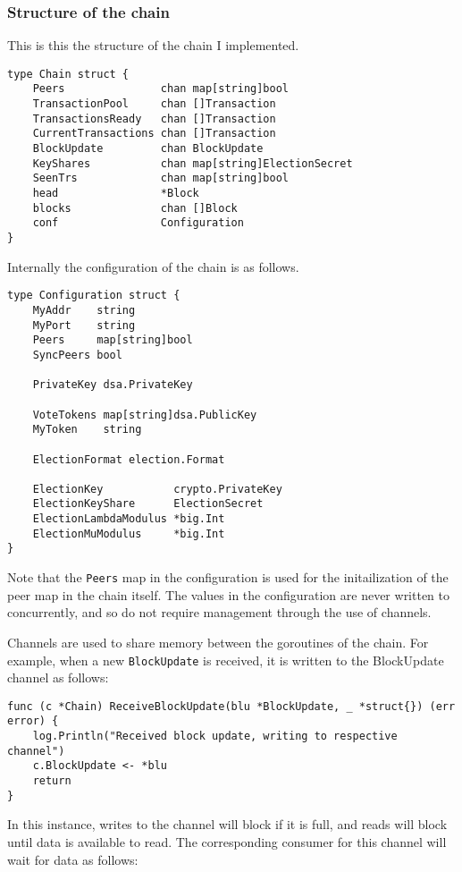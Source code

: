 \documentclass[a4paper,12pt]{article}
\begin{document}
\subsubsection{Structure of the chain}
This is this the structure of the chain I implemented.
\begin{Verbatim}[obeytabs,tabsize=4]
type Chain struct {
	Peers               chan map[string]bool
	TransactionPool     chan []Transaction
	TransactionsReady   chan []Transaction
	CurrentTransactions chan []Transaction
	BlockUpdate         chan BlockUpdate
	KeyShares           chan map[string]ElectionSecret
	SeenTrs             chan map[string]bool
	head                *Block
	blocks              chan []Block
	conf                Configuration
}
\end{Verbatim}

Internally the configuration of the chain is as follows.
\begin{Verbatim}[obeytabs,tabsize=4]
type Configuration struct {
	MyAddr    string
	MyPort    string
	Peers     map[string]bool
	SyncPeers bool

	PrivateKey dsa.PrivateKey

	VoteTokens map[string]dsa.PublicKey
	MyToken    string

	ElectionFormat election.Format

	ElectionKey           crypto.PrivateKey
	ElectionKeyShare      ElectionSecret
	ElectionLambdaModulus *big.Int
	ElectionMuModulus     *big.Int
}
\end{Verbatim}

Note that the \verb|Peers| map in the configuration is used for the initailization of the peer map in the chain itself. The values in the configuration are never written to concurrently, and so do not require management through the use of channels.

Channels are used to share memory between the goroutines of the chain. For example, when a new \verb|BlockUpdate| is received, it is written to the BlockUpdate channel as follows:

\begin{Verbatim}[obeytabs,tabsize=4]
func (c *Chain) ReceiveBlockUpdate(blu *BlockUpdate, _ *struct{}) (err error) {
	log.Println("Received block update, writing to respective channel")
	c.BlockUpdate <- *blu
	return
}
\end{Verbatim}

In this instance, writes to the channel will block if it is full, and reads will block until data is available to read. The corresponding consumer for this channel will wait for data as follows:
\end{document}
